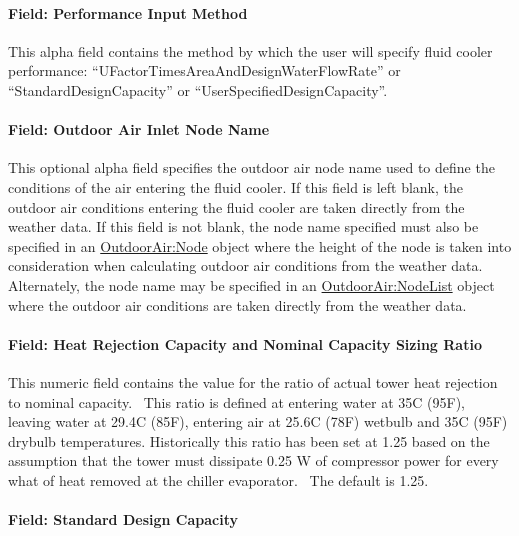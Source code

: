 \paragraph{Field: Performance Input Method}\label{field-performance-input-method-3}

This alpha field contains the method by which the user will specify fluid cooler performance: ``UFactorTimesAreaAndDesignWaterFlowRate'' or ``StandardDesignCapacity'' or ``UserSpecifiedDesignCapacity''.

\paragraph{Field: Outdoor Air Inlet Node Name}\label{field-outdoor-air-inlet-node-name-4}

This optional alpha field specifies the outdoor air node name used to define the conditions of the air entering the fluid cooler. If this field is left blank, the outdoor air conditions entering the fluid cooler are taken directly from the weather data. If this field is not blank, the node name specified must also be specified in an \hyperref[outdoorairnode]{OutdoorAir:Node} object where the height of the node is taken into consideration when calculating outdoor air conditions from the weather data. Alternately, the node name may be specified in an \hyperref[outdoorairnodelist]{OutdoorAir:NodeList} object where the outdoor air conditions are taken directly from the weather data.

\paragraph{Field: Heat Rejection Capacity and Nominal Capacity Sizing Ratio}\label{field-heat-rejection-capacity-and-nominal-capacity-sizing-ratio-3}

This numeric field contains the value for the ratio of actual tower heat rejection to nominal capacity.~ This ratio is defined at entering water at 35C (95F), leaving water at 29.4C (85F), entering air at 25.6C (78F) wetbulb and 35C (95F) drybulb temperatures. Historically this ratio has been set at 1.25 based on the assumption that the tower must dissipate 0.25 W of compressor power for every what of heat removed at the chiller evaporator.~ The default is 1.25.

\paragraph{Field: Standard Design Capacity}\label{field-standard-design-capacity}

